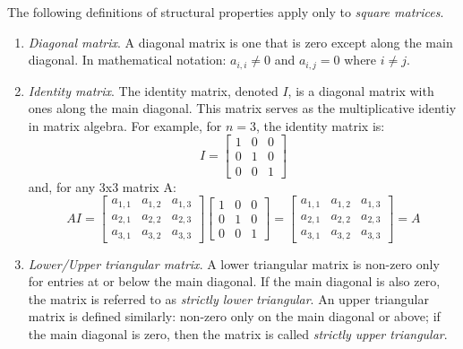 \noindent The following definitions of structural properties apply only to \emph{square matrices}.
\begin{enumerate}[resume]

\item \emph{Diagonal matrix}.  A diagonal matrix is one that is zero except along the main diagonal. In mathematical notation: $a_{i,i} \ne 0 $ and $a_{i,j} = 0$ where $i \ne j$.

\item \emph{Identity matrix}.  The identity matrix, denoted $I$, is a diagonal matrix with ones along the main diagonal.  This matrix serves as the multiplicative identiy in matrix algebra.  For example, for $n=3$, the identity matrix is:
\begin{equation*}
I = \left[
\begin{matrix}
1 & 0 & 0 \\
0 & 1 & 0 \\
0 & 0 & 1
\end{matrix}
\right]
\end{equation*}
and, for any 3x3 matrix A:
\begin{equation*}
AI = \left[
\begin{matrix}
a_{1,1} & a_{1,2} & a_{1,3} \\
a_{2,1} & a_{2,2} & a_{2,3} \\
a_{3,1} & a_{3,2} & a_{3,3}
\end{matrix}
\right]
\left[
\begin{matrix}
1 & 0 & 0 \\
0 & 1 & 0 \\
0 & 0 & 1
\end{matrix}
\right]
=
\left[
\begin{matrix}
a_{1,1} & a_{1,2} & a_{1,3} \\
a_{2,1} & a_{2,2} & a_{2,3} \\
a_{3,1} & a_{3,2} & a_{3,3}
\end{matrix}
\right]
= 
A
\end{equation*}

\item \emph{Lower/Upper triangular matrix}.  A lower triangular matrix is non-zero only for entries at or below the main diagonal.  If the main diagonal is also zero, the matrix is referred to as \emph{strictly lower triangular}.  An upper triangular matrix is defined similarly: non-zero only on the main diagonal or above; if the main diagonal is zero, then the matrix is called \emph{strictly upper triangular}.
\end{enumerate}


